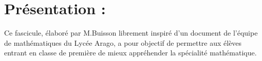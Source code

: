 \documentclass[10pt,a4paper]{article}  %
\begin{document}
	\graphicspath{{images/}}
	
	\begin{center}
		
		
	\end{center}
	
\vspace*{-0.7cm}
\section*{Présentation :}
Ce fascicule, élaboré par M.Buisson librement inspiré d'un document de l'équipe de mathématiques du Lycée Arago, a pour objectif de permettre aux élèves entrant en classe de première de mieux appréhender la spécialité mathématique.

\vspace*{-0.5cm}
\end{document}
